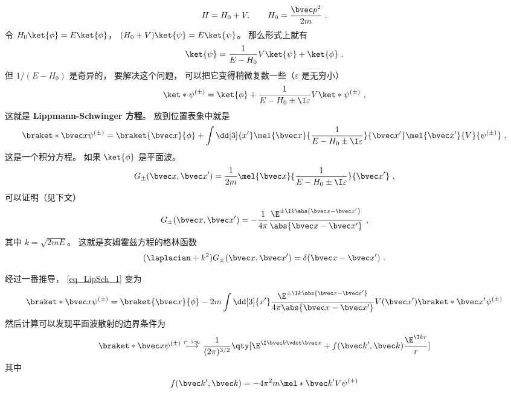 

\begin{equation}
H = H_0 + V, \qquad H_0 = \frac{\bvec p^2}{2m}~.
\end{equation}
令 $H_0\ket{\phi} = E\ket{\phi}$， $(H_0+V)\ket{\psi}=E\ket{\psi}$。 那么形式上就有
\begin{equation}
\ket{\psi} = \frac{1}{E-H_0} V\ket{\psi} + \ket{\phi}~.
\end{equation}
但 $1/(E-H_0)$ 是奇异的， 要解决这个问题， 可以把它变得稍微复数一些（$\varepsilon$ 是无穷小）
\begin{equation}
\ket*{\psi^{(\pm)}} = \ket{\phi} + \frac{1}{E-H_0\pm \I\varepsilon} V \ket*{\psi^{(\pm)}}~,
\end{equation}
这就是 \textbf{Lippmann-Schwinger 方程}。 放到位置表象中就是
\begin{equation}\label{eq_LipSch_1}
\braket*{\bvec x}{\psi^{(\pm)}} = \braket{\bvec x}{\phi} + \int \dd[3]{x'} \mel{\bvec x}{\frac{1}{E-H_0\pm \I\varepsilon}}{\bvec x'} \mel{\bvec x'}{V}{\psi^{(\pm)}}~,
\end{equation}
这是一个积分方程。 如果 $\ket{\phi}$ 是平面波。
\begin{equation}\label{eq_LipSch_2}
G_\pm (\bvec x, \bvec x') = \frac{1}{2m} \mel{\bvec x}{\frac{1}{E-H_0\pm \I\varepsilon}}{\bvec x'}~,
\end{equation}
可以证明（见下文）
\begin{equation}\label{eq_LipSch_3}
G_\pm (\bvec x, \bvec x') = -\frac{1}{4\pi} \frac{\E^{\pm\I k\abs{\bvec x-\bvec x'}}}{\abs{\bvec x-\bvec x'}}~,
\end{equation}
其中 $k = \sqrt{2mE}$。 这就是亥姆霍兹方程的格林函数
\begin{equation}
(\laplacian +k^2)G_\pm (\bvec x, \bvec x') = \delta(\bvec x-\bvec x')~.
\end{equation}

经过一番推导， \autoref{eq_LipSch_1} 变为
\begin{equation}
\braket*{\bvec x}{\psi^{(\pm)}} = \braket{\bvec x}{\phi} - 2m\int \dd[3]{x'} \frac{\E^{\pm\I k\abs{\bvec x-\bvec x'}}}{4\pi\abs{\bvec x-\bvec x'}} V(\bvec x')\braket*{\bvec x'}{\psi^{(\pm)}}
\end{equation}
然后计算可以发现平面波散射的边界条件为
\begin{equation}
\braket*{\bvec x}{\psi^{(\pm)}} \overset{r\to\infty}{\longrightarrow} \frac{1}{(2\pi)^{3/2}} \qty[\E^{\I \bvec k\vdot \bvec x} + f(\bvec k', \bvec k)\frac{\E^{\I kr}}{r}]
\end{equation}
其中
\begin{equation}
f(\bvec k', \bvec k) = -4\pi^2 m \mel*{\bvec k'}{V}{\psi^{(+)}}
\end{equation}

